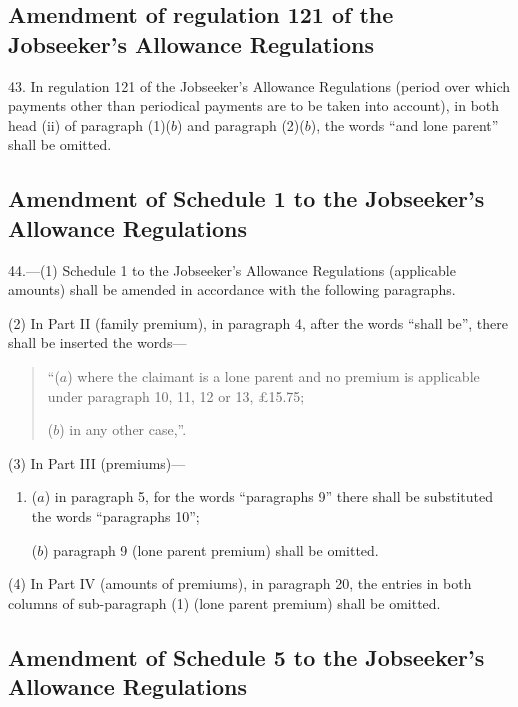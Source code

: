 \documentclass[12pt,a4paper]{article}
\begin{document}
\subsection[43. Amendment of regulation 121 of the Jobseeker’s Allowance Regulations]{Amendment of regulation 121 of the Jobseeker’s Allowance Regulations}

43.  In regulation 121 of the Jobseeker’s Allowance Regulations (period over which payments other than periodical payments are to be taken into account), in both head (ii) of paragraph (1)($b$) and paragraph (2)($b$), the words “and lone parent” shall be omitted.

\subsection[44. Amendment of Schedule 1 to the Jobseeker’s Allowance Regulations]{Amendment of Schedule 1 to the Jobseeker’s Allowance Regulations}

44.—(1) Schedule 1 to the Jobseeker’s Allowance Regulations (applicable amounts) shall be amended in accordance with the following paragraphs.

(2) In Part II (family premium), in paragraph 4, after the words “shall be”, there shall be inserted the words—
\begin{quotation}
“($a$) where the claimant is a lone parent and no premium is applicable under paragraph 10, 11, 12 or 13, £15.75;

($b$) in any other case,”.
\end{quotation}

(3) In Part III (premiums)—
\begin{enumerate}\item[]
($a$) in paragraph 5, for the words “paragraphs 9” there shall be substituted the words “paragraphs 10”;

($b$) paragraph 9 (lone parent premium) shall be omitted.
\end{enumerate}

(4) In Part IV (amounts of premiums), in paragraph 20, the entries in both columns of sub-paragraph (1) (lone parent premium) shall be omitted.

\subsection[45. Amendment of Schedule 5 to the Jobseeker’s Allowance Regulations]{Amendment of Schedule 5 to the Jobseeker’s Allowance Regulations}
\end{document}
